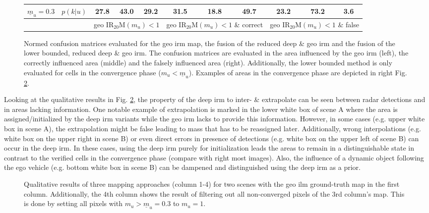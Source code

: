 \begin{figure}[H]
\begin{center}
{\begin{tabular}{c|c|ccc|ccc|ccc}
	\scriptsize{$\underline{m}_u = 0.3$}&$p(k|u)$ & 27.8 & 43.0 & 29.2& 31.5 & 18.8 & 49.7& 23.2 & 73.2 & 3.6 \\
\hline
	& & \multicolumn{3}{c|}{\scriptsize{geo IR$_{20}$M$(m_u) < 1$}} & \multicolumn{3}{c|}{\scriptsize{geo IR$_{20}$M$(m_u) < 1$ \& correct}} & \multicolumn{3}{c}{\scriptsize{geo IR$_{20}$M$(m_u) < 1$ \& false}} 
\end{tabular}}
\caption{\label{tab:quant_analysis_of_prior}Normed confusion matrices evaluated for the geo \gls{irm} map, the fusion of the reduced deep \& geo \gls{irm} and the fusion of the lower bounded, reduced deep \& geo \gls{irm}. The confusion matrices are evaluated in the area influenced by the geo \gls{irm} (left), the correctly influenced area (middle) and the falsely influenced area (right). Additionally, the lower bounded method is only evaluated for cells in the convergence phase ($m_u < \underline{m}_u$). Examples of areas in the convergence phase are depicted in right Fig. \ref{fig:qual_analysis_of_prior}.}
\end{center}
\end{figure}
%
Looking at the qualitative results in Fig. \ref{fig:qual_analysis_of_prior}, the property of the deep \gls{irm} to inter- \& extrapolate can be seen between radar detections and in areas lacking information. One notable example of extrapolation is marked in the lower white box of scene A where the area is assigned/initialized by the deep \gls{irm} variants while the geo \gls{irm} lacks to provide this information. However, in some cases (e.g. upper white box in scene A), the extrapolation might be false leading to mass that has to be reassigned later. Additionally, wrong interpolations (e.g. white box on the upper right in scene B) or even direct errors in presence of detections (e.g. white box on the upper left of scene B) can occur in the deep \gls{irm}. In these cases, using the deep \gls{irm} purely for initialization leads the areas to remain in a distinguishable state in contrast to the verified cells in the convergence phase (compare with right most images). Also, the influence of a dynamic object following the ego vehicle (e.g. bottom white box in scene B) can be dampened and distinguished using the deep \gls{irm} as a prior.
%
\begin{figure}[H]
	\begin{center}
		\caption{\label{fig:qual_analysis_of_prior}Qualitative results of three mapping approaches (column 1-4) for two scenes with the geo \gls{ilm} ground-truth map in the first column. Additionally, the 4th column shows the result of filtering out all non-converged pixels of the 3rd column's map. This is done by setting all pixels with $m_u > \underline{m}_u = 0.3$ to $m_u = 1$.}
	\end{center}
\end{figure}
%
